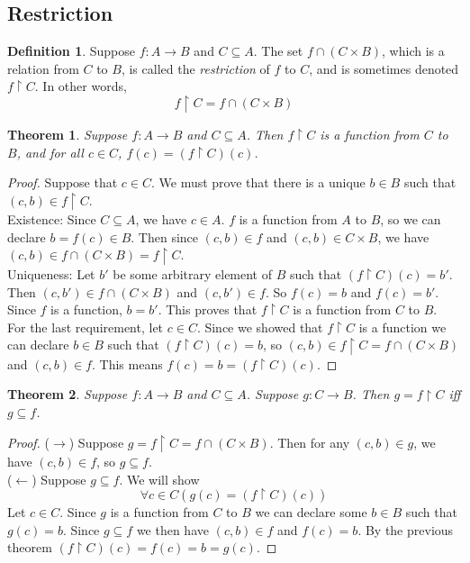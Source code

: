 \documentclass{report}
\newtheorem*{theorem}{Theorem}
\theoremstyle{definition}
\newtheorem*{definition}{Definition}
\begin{document}
\subsection{Restriction}
\begin{definition}
Suppose $f:A\to B$ and $C\subseteq A$. The set $f\cap(C\times B)$, which is a relation from $C$ to $B$, is called
the \textit{restriction} of $f$ to $C$, and is sometimes denoted $f\restriction C$. In other words,
\begin{equation*}
f\restriction C=f\cap(C\times B)
\end{equation*}
\end{definition}
\begin{theorem}
Suppose $f:A\to B$ and $C\subseteq A$. Then $f\restriction C$ is a function from $C$ to $B$, and for all $c\in C$, 
$f(c)=(f\restriction C)(c)$.
\end{theorem}
\begin{proof}
Suppose that $c\in C$. We must prove that there is a unique $b\in B$ such that $(c,b)\in f\restriction C$.\\
\indent Existence: Since $C\subseteq A$, we have $c\in A$.
$f$ is a function from $A$ to $B$, so we can declare $b=f(c)\in B$. Then since $(c,b)\in f$ and 
$(c,b)\in C\times B$, we have $(c,b)\in f\cap(C\times B)=f\restriction C$.\\
\indent Uniqueness: Let $b'$ be some arbitrary element of $B$ such that $(f\restriction C)(c)=b'$. Then 
$(c,b')\in f\cap(C\times B)$ and $(c,b')\in f$. So $f(c)=b$ and $f(c)=b'$. Since $f$ is a function, $b=b'$.
This proves that $f\restriction C$ is a function from $C$ to $B$.\\
\indent For the last requirement, let $c\in C$. Since we showed that $f\restriction C$ is a function we can
declare $b\in B$ such that $(f\restriction C)(c)=b$, so
$(c,b)\in f\restriction C=f\cap(C\times B)$ and $(c,b)\in f$. This means $f(c)=b=(f\restriction C)(c)$.
\end{proof}
\begin{theorem}
Suppose $f:A\to B$ and $C\subseteq A$. Suppose $g:C\to B$.
Then $g=f\restriction C$ iff $g\subseteq f$.
\end{theorem}
\begin{proof}
($\rightarrow$) Suppose $g=f\restriction C=f\cap(C\times B)$. Then for any $(c,b)\in g$, we have $(c,b)\in f$, 
so $g\subseteq f$.\\
\indent ($\leftarrow$) Suppose $g\subseteq f$. We will show
\begin{equation*}
\forall c\in C(g(c)=(f\restriction C)(c))
\end{equation*}
Let $c\in C$. Since $g$ is a function from $C$ to $B$ we can declare some $b\in B$ such that $g(c)=b$.
Since $g\subseteq f$ we then have $(c,b)\in f$ and $f(c)=b$. By the previous theorem
$(f\restriction C)(c)=f(c)=b=g(c)$.
\end{proof}
\newpage
\end{document}
